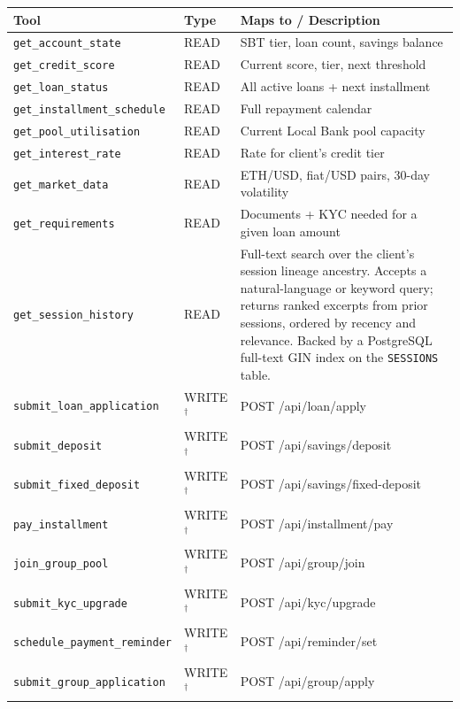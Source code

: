 \documentclass[12pt,a4paper]{report}
\newcommand{\tableheadcolor}{\rowcolor{TableHeadBg}}
\begin{document}
\begin{table}[H]
\centering
\begin{tabular}{p{4.8cm}p{1.4cm}p{6.3cm}}
\toprule
\tableheadcolor
\textbf{Tool} & \textbf{Type} & \textbf{Maps to / Description} \\
\midrule
\texttt{get\_account\_state}         & READ & SBT tier, loan count, savings balance \\
\texttt{get\_credit\_score}          & READ & Current score, tier, next threshold \\
\texttt{get\_loan\_status}           & READ & All active loans + next installment \\
\texttt{get\_installment\_schedule}  & READ & Full repayment calendar \\
\texttt{get\_pool\_utilisation}      & READ & Current Local Bank pool capacity \\
\texttt{get\_interest\_rate}         & READ & Rate for client's credit tier \\
\texttt{get\_market\_data}           & READ & ETH/USD, fiat/USD pairs, 30-day volatility \\
\texttt{get\_requirements}           & READ & Documents + KYC needed for a given loan amount \\
\texttt{get\_session\_history}       & READ & Full-text search over the client's session lineage ancestry. Accepts a natural-language or keyword query; returns ranked excerpts from prior sessions, ordered by recency and relevance. Backed by a PostgreSQL full-text GIN index on the \texttt{SESSIONS} table. \\
\texttt{submit\_loan\_application}   & WRITE$^{\dagger}$ & POST /api/loan/apply \\
\texttt{submit\_deposit}             & WRITE$^{\dagger}$ & POST /api/savings/deposit \\
\texttt{submit\_fixed\_deposit}      & WRITE$^{\dagger}$ & POST /api/savings/fixed-deposit \\
\texttt{pay\_installment}            & WRITE$^{\dagger}$ & POST /api/installment/pay \\
\texttt{join\_group\_pool}           & WRITE$^{\dagger}$ & POST /api/group/join \\
\texttt{submit\_kyc\_upgrade}        & WRITE$^{\dagger}$ & POST /api/kyc/upgrade \\
\texttt{schedule\_payment\_reminder} & WRITE$^{\dagger}$ & POST /api/reminder/set \\
\texttt{submit\_group\_application}  & WRITE$^{\dagger}$ & POST /api/group/apply \\
\bottomrule
\end{tabular}


\end{table}
\end{document}
